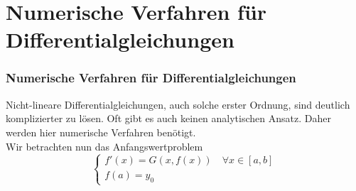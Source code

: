 \section{Numerische Verfahren für Differentialgleichungen}
\makeSectionDividerPage
\begin{frame}\frametitle{Numerische Verfahren für Differentialgleichungen}
Nicht-lineare Differentialgleichungen, auch solche erster Ordnung, sind deutlich komplizierter zu lösen. Oft gibt es auch keinen analytischen Ansatz. Daher werden hier numerische Verfahren benötigt. \pause\\ \vfill
Wir betrachten nun das Anfangswertproblem
$$
\begin{cases}
f'(x)=G(x,f(x)) \quad \forall x \in [a,b]\\
f(a)=y_0
\end{cases}
$$
\end{frame}
%
